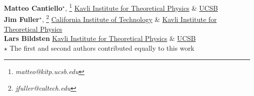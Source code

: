 \textbf{Matteo Cantiello}$^\star$, \footnote{\textit{matteo@kitp.ucsb.edu}} \href{https://www.authorea.com/inst/7192}{Kavli Institute for Theoretical Physics} \& \href{https://www.authorea.com/inst/7191}{UCSB} \\
\textbf{Jim Fuller}$^\star$, \footnote{\textit{jfuller@caltech.edu}} \href{https://www.authorea.com/inst/943}{California Institute of Technology} \& \href{https://www.authorea.com/inst/7192}{Kavli Institute for Theoretical Physics}\\
\textbf{Lars Bildsten} \href{https://www.authorea.com/inst/7192}{Kavli Institute for Theoretical Physics} \& \href{https://www.authorea.com/inst/7191}{UCSB}\\

$\star$ The first and second authors contributed equally to this work
